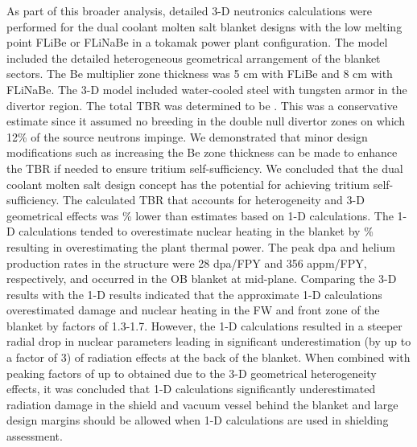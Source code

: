 As part of this broader analysis, detailed 3-D neutronics calculations were
performed for the dual coolant molten salt blanket designs with the low
melting point FLiBe or FLiNaBe in a tokamak power plant configuration. The
model included the detailed heterogeneous geometrical arrangement of the
blanket sectors. The Be multiplier zone thickness was 5 cm with FLiBe and 8 cm
with FLiNaBe. The 3-D model included water-cooled steel with tungsten armor in
the divertor region. The total TBR was determined to be .
This was a conservative estimate since it assumed no breeding in the double
null divertor zones on which 12\% of the source neutrons impinge. We
demonstrated that minor design modifications such as increasing the Be zone
thickness can be made to enhance the \gls{TBR} if needed to ensure tritium
self-sufficiency. We concluded that the dual coolant molten salt design
concept has the potential for achieving tritium self-sufficiency. The
calculated \gls{TBR} that accounts for heterogeneity and 3-D geometrical
effects was \% lower than estimates based on 1-D
calculations. The 1-D calculations tended to overestimate nuclear heating in
the blanket by \% resulting in overestimating the plant thermal
power. The peak dpa and helium production rates in the structure were 28
dpa/FPY and 356 appm/FPY, respectively, and occurred in the \gls{OB} blanket at
mid-plane. Comparing the 3-D results with the 1-D results indicated that the
approximate 1-D calculations overestimated damage and nuclear heating in the
\gls{FW} and front zone of the blanket by factors of 1.3-1.7. However, the 1-D
calculations resulted in a steeper radial drop in nuclear parameters leading
in significant underestimation (by up to a factor of 3) of radiation effects
at the back of the blanket. When combined with peaking factors of up to
 obtained due to the 3-D geometrical heterogeneity effects, it
was concluded that 1-D calculations significantly underestimated radiation
damage in the shield and vacuum vessel behind the blanket and large design
margins should be allowed when 1-D calculations are used in shielding
assessment.

